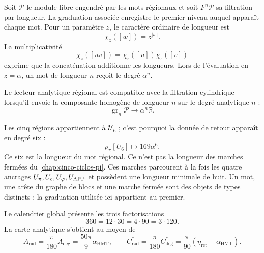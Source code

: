 
Soit \(\mathcal P\) le module libre engendré par les mots régionaux et
soit \(F^n\mathcal P\) sa filtration par longueur. La graduation associée
enregistre le premier niveau auquel apparaît chaque mot. Pour un paramètre
\(z\), le caractère ordinaire de longueur est
\[
\chi_z([w])=z^{|w|}.
\]
La multiplicativité
\[
\chi_z([uv])=\chi_z([u])\chi_z([v])
\]
exprime que la concaténation additionne les longueurs. Lors de l'évaluation en
\(z=\alpha\), un mot de longueur \(n\) reçoit le degré \(\alpha^n\).

\begin{definition}
\label{p3-20260826:def:compatibilidad-grado}
Le lecteur analytique régional est compatible avec la filtration cylindrique
lorsqu'il envoie la composante homogène de longueur \(n\) sur le degré analytique
\(n\) :
\[
\operatorname{gr}_n\mathcal P\longrightarrow
\alpha^n\mathbb R.
\]
\end{definition}

Les cinq régions appartiennent à \(\mathcal U_6\) ; c'est pourquoi la donnée de
retour apparaît en degré six :
\[
\rho_\pi[U_6]\longmapsto169\alpha^6.
\]
Ce six est la longueur du mot régional. Ce n'est pas la longueur des
marches fermées du \cref{chap:cinco-ciclos-pi}. Ces marches parcourent à
la fois les quatre ancrages
\(U_\pi,U_e,U_\varphi,U_{\rm APP}\) et possèdent une longueur minimale de huit. Un
mot, une arête du graphe de blocs et une marche fermée sont des objets de
types distincts ; la graduation utilisée ici appartient au premier.

Le calendrier global présente les trois factorisations
\begin{equation}
 360=12\cdot30=4\cdot90=3\cdot120.
 \label{eq:l9s102:360-factorizaciones}
\end{equation}
La carte analytique s'obtient au moyen de
\begin{equation}
 A_{\mathrm{rad}}=\frac\pi{180}A_{\deg}
 =\frac{50\pi}{9}\alpha_{\mathrm{HMT}},
 \qquad
 C^*_{\mathrm{rad}}=\frac\pi{180}C^*_{\deg}
 =\frac\pi{90}(\eta_{\mathrm{ret}}+\alpha_{\mathrm{HMT}}).
 \label{eq:l9s102:a-cstar-rad}
\end{equation}

